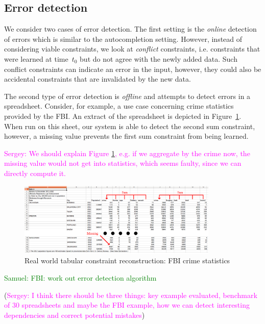 \documentclass{sig-alternate-05-2015}
\newcommand{\sergey}[1]{\textcolor{magenta}{{\sc Sergey:} #1}\xspace}
\newcommand{\samuel}[1]{\textcolor{green}{{\sc Samuel:} #1}\xspace}
\begin{document}
\subsection{Error detection}
We consider two cases of error detection.
The first setting is the \textit{online} detection of errors which is similar to the autocompletion setting.
However, instead of considering viable constraints, we look at \textit{conflict} constraints, i.e. constraints that were learned at time~$t_0$ but do not agree with the newly added data.
Such conflict constraints can indicate an error in the input, however, they could also be accidental constraints that are invalidated by the new data.

The second type of error detection is \textit{offline} and attempts to detect errors in a spreadsheet.
Consider, for example, a use case concerning crime statistics provided by the FBI.
An extract of the spreadsheet is depicted in Figure~\ref{fig:fbi}.
When run on this sheet, our system is able to detect the second sum constraint, however, a missing value prevents the first sum constraint from being learned.


\sergey{We should explain Figure \ref{fig:fbi}, e.g. if we aggregate by the crime now, the missing value would not get into statistics, which seems faulty, since we can directly compute it.}

\begin{figure}[thb]
  \begin{center}
    \includegraphics[width=0.85\textwidth]{figures/fbi_figure_highlighted.png}
  \end{center}
  \caption{Real world tabular constraint reconstruction: FBI crime statistics}
  \label{fig:fbi}
\end{figure}

\samuel{FBI: work out error detection algorithm}

(\sergey{I think there should be three things: key example evaluated, benchmark of 30 spreadsheets and maybe the FBI example, how we can detect interesting dependencies and correct potential mistakes})
\end{document}
